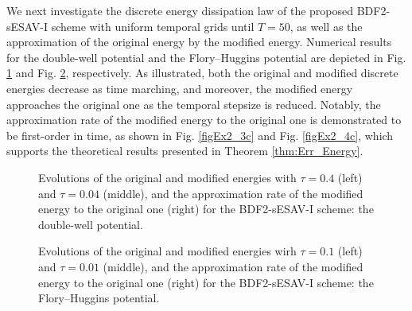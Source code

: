 \documentclass{m2an}
\begin{document}
We next investigate the discrete energy dissipation law of the proposed BDF2-sESAV-I scheme with uniform temporal grids until $ T = 50 $, as well as the approximation of  the original energy by the modified energy. Numerical results for the double-well potential and the Flory--Huggins potential are depicted in Fig. \ref{figEx2_3} and Fig. \ref{figEx2_4}, respectively. As illustrated, both the original  and modified discrete energies decrease as time marching, and moreover, the modified energy approaches the original one as the temporal stepsize is reduced. Notably, the approximation rate of the modified energy to the original one is demonstrated to be first-order in time, as shown in Fig. \ref{figEx2_3c} and Fig. \ref{figEx2_4c}, which supports the theoretical results presented in Theorem \ref{thm:Err_Energy}.
\begin{figure}[!ht]
	\vspace{-8pt}
	\centering
	\setlength{\abovecaptionskip}{0.0cm} 
	\setlength{\belowcaptionskip}{0.0cm}
	\caption{Evolutions of the original and modified energies with $\tau = 0.4$ (left) and $ \tau = 0.04 $ (middle), and the approximation rate of the modified energy to the original one (right) for the BDF2-sESAV-I scheme: the double-well potential.}
	\label{figEx2_3}
\end{figure}
%
\begin{figure}[!ht]
	\vspace{-10pt}
	\centering
	\setlength{\abovecaptionskip}{0.0cm} 
	\setlength{\belowcaptionskip}{0.0cm}
	\caption{Evolutions of the original and modified energies wirh $\tau = 0.1$ (left) and $ \tau = 0.01 $ (middle), and the approximation rate of the modified energy to the original one (right) for the BDF2-sESAV-I scheme: the Flory--Huggins potential.}
	\label{figEx2_4}
	\vspace{-10pt}
\end{figure}
\end{document}
